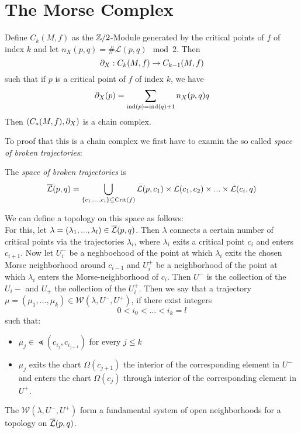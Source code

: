 \section{The Morse Complex}

\begin{prop}
    Define $C_k(M, f)$ as the ${ \mathbb Z }/2$-Module generated by the critical points of $f$ of
    index $k$ and let $n_X(p, q) = \# \mathcal{L}(p, q) \mod 2$. Then
    \[ { \partial }_X : C_k(M, f) \to C_{k-1}(M, f) \]
    such that if $p$ is a critical point of $f$ of index $k$, we have
    \[ { \partial }_X(p) = \sum_{{ \operatorname{ind} }(p) = { \operatorname{ind} }(q) + 1} n_X(p, q)q \]
    Then $(C_*(M, f), { \partial }_X)$ is a chain complex.
\end{prop}

To proof that this is a chain complex we first have to examin the so called
\textit{space of broken trajectories}:

\begin{definition}
    The \textit{space of broken trajectories} is
    \[ 
        {\overline{\mathcal{L}} }(p, q) = \bigcup_{ \{c_1, ..., c_i\} \subseteq { \operatorname{Crit} }(f )} 
            { \mathcal{L} } (p, c_1) \times { \mathcal{L} } (c_1, c_2) \times ... \times { \mathcal{L} }(c_i, q) 
    \]

    We can define a topology on this space as follows: \\
    For this, let $\lambda = (\lambda_1, ..., \lambda_l) \in {\overline{\mathcal{L}} }(p, q)$. Then $\lambda$ 
    connects a certain number of critical points via the trajectories $\lambda_i$, where 
    $\lambda_i$ exits a critical point $c_i$ and enters $c_{i+1}$. Now let $U_i^-$ be a 
    neghboehood of the point at which $\lambda_i$ exits the chosen Morse neighborhood 
    around $c_{i-1}$ and $U_i^+$ be a neighborhood of the point at which $\lambda_i$
    enters the Morse-neighborhood of $c_i$. Then $U^-$ is the collection of the $U_i-$
    and $U_+$ the collection of the $U_i^+$. Then we say that a trajectory 
    $\mu = (\mu_1, ..., \mu_k) \in \mathcal{W}(\lambda, U^-, U^+)$, if there exist 
    integers
    \[ 0 < i_0 < ... < i_k = l \]
    such that:
    \begin{itemize}
        \item $\mu_j \in \Lt(c_{i_j}, c_{i_{j+1}})$ for every $j \leq k$
        \item $\mu_j$ exits the chart $\Omega(c_{j+1})$ the interior of the corresponding
            element in $U^-$ and enters the chart $\Omega(c_{j})$ through  interior of 
            the corresponding element in $U^+$.
    \end{itemize}
    The $\mathcal{W}(\lambda, U^-, U^+)$ form a fundamental system of open neighborhoods 
    for a topology on ${\overline{\mathcal{L}} }(p, q)$. 
\end{definition}

